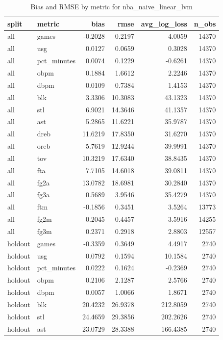 \begin{table}
\caption{Bias and RMSE by metric for nba_naive_linear_lvm}
\label{tab:nba_naive_linear_lvm_bias_rmse}
\begin{tabular}{llrrrr}
\toprule
split & metric & bias & rmse & avg\_log\_loss & n\_obs \\
\midrule
all & games & -0.2028 & 0.2197 & 4.0059 & 14370 \\
all & usg & 0.0127 & 0.0659 & 0.3028 & 14370 \\
all & pct\_minutes & 0.0074 & 0.1229 & -0.6261 & 14370 \\
all & obpm & 0.1884 & 1.6612 & 2.2246 & 14370 \\
all & dbpm & 0.0109 & 0.7384 & 1.4153 & 14370 \\
all & blk & 3.3306 & 10.3083 & 43.1323 & 14370 \\
all & stl & 6.9021 & 14.3646 & 41.1357 & 14370 \\
all & ast & 5.2865 & 11.6221 & 35.9787 & 14370 \\
all & dreb & 11.6219 & 17.8350 & 31.6270 & 14370 \\
all & oreb & 5.7619 & 12.9244 & 39.9991 & 14370 \\
all & tov & 10.3219 & 17.6340 & 38.8435 & 14370 \\
all & fta & 7.7105 & 14.6018 & 39.0811 & 14370 \\
all & fg2a & 13.0782 & 18.6981 & 30.2840 & 14370 \\
all & fg3a & 0.5689 & 3.9546 & 35.4279 & 14370 \\
all & ftm & -0.1856 & 0.3451 & 3.5264 & 13773 \\
all & fg2m & 0.2045 & 0.4457 & 3.5916 & 14255 \\
all & fg3m & 0.2371 & 0.2918 & 2.8803 & 12557 \\
holdout & games & -0.3359 & 0.3649 & 4.4917 & 2740 \\
holdout & usg & 0.0792 & 0.1594 & 10.1584 & 2740 \\
holdout & pct\_minutes & 0.0222 & 0.1624 & -0.2369 & 2740 \\
holdout & obpm & 0.2106 & 2.1287 & 2.5766 & 2740 \\
holdout & dbpm & 0.0057 & 1.0066 & 1.8671 & 2740 \\
holdout & blk & 20.4232 & 26.9378 & 212.8059 & 2740 \\
holdout & stl & 24.4659 & 29.3856 & 202.2626 & 2740 \\
holdout & ast & 23.0729 & 28.3388 & 166.4385 & 2740 \\

\end{tabular}
\end{table}

